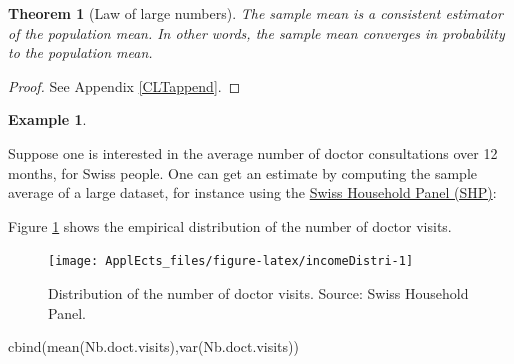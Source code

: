 \documentclass[
  12pt,
]{book}
\newenvironment{Shaded}{\begin{snugshade}}{\end{snugshade}}
\newcommand{\AttributeTok}[1]{\textcolor[rgb]{0.77,0.63,0.00}{#1}}
\newcommand{\CommentTok}[1]{\textcolor[rgb]{0.56,0.35,0.01}{\textit{#1}}}
\newcommand{\DecValTok}[1]{\textcolor[rgb]{0.00,0.00,0.81}{#1}}
\newcommand{\FunctionTok}[1]{\textcolor[rgb]{0.00,0.00,0.00}{#1}}
\newcommand{\NormalTok}[1]{#1}
\newcommand{\OtherTok}[1]{\textcolor[rgb]{0.56,0.35,0.01}{#1}}
\newcommand{\SpecialCharTok}[1]{\textcolor[rgb]{0.00,0.00,0.00}{#1}}
\newtheorem{theorem}{Theorem}[chapter]
\theoremstyle{definition}
\theoremstyle{definition}
\newtheorem{example}{Example}[chapter]
\theoremstyle{definition}
\theoremstyle{definition}
\theoremstyle{remark}
\begin{document}
\begin{theorem}[Law of large numbers]
\protect\hypertarget{thm:LLN}{}\label{thm:LLN}The sample mean is a consistent estimator of the population mean. In other words, the sample mean converges in probability to the population mean.
\end{theorem}

\begin{proof}
See Appendix \ref{CLTappend}.
\end{proof}

\begin{example}
\protect\hypertarget{exm:doctorVisits}{}\label{exm:doctorVisits}

Suppose one is interested in the average number of doctor consultations over 12 months, for Swiss people. One can get an estimate by computing the sample average of a large dataset, for instance using the \href{https://forscenter.ch/projects/swiss-household-panel/}{Swiss Household Panel (SHP)}:

Figure \ref{fig:incomeDistri} shows the empirical distribution of the number of doctor visits.

\begin{Shaded}
\end{Shaded}

\begin{figure}
\texttt{[image: ApplEcts\_files/figure-latex/incomeDistri-1]} \caption{Distribution of the number of doctor visits. Source: Swiss Household Panel.}\label{fig:incomeDistri}
\end{figure}

\begin{Shaded}
\begin{Highlighting}[]
\FunctionTok{cbind}\NormalTok{(}\FunctionTok{mean}\NormalTok{(Nb.doct.visits),}\FunctionTok{var}\NormalTok{(Nb.doct.visits))}
\end{Highlighting}
\end{Shaded}


\end{example}
\end{document}
